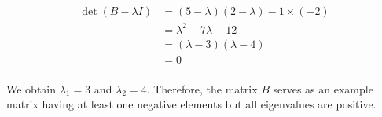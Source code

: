 \begin{solution}
    \[
        \begin{align*}
            \det(B - \lambda I)
            &= (5 - \lambda)(2 - \lambda) - 1 \times (-2) \\
            &= \lambda^2 - 7\lambda + 12 \\
            &= (\lambda - 3)(\lambda -4) \\
            &= 0 \\
        \end{align*}
    \]

    We obtain $\lambda_1 = 3$ and $\lambda_2 = 4$.
    Therefore, the matrix $B$ serves as an example matrix having at least one negative elements but all eigenvalues are positive.
\end{solution}

\newpage